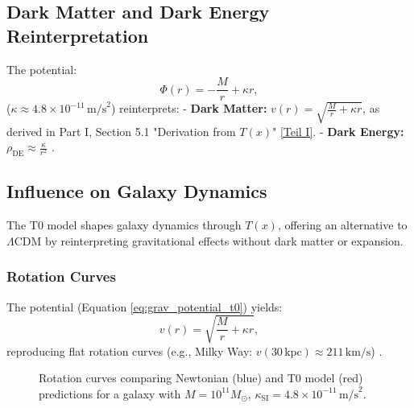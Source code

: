 \documentclass[twocolumn,aps,prl]{revtex4-2}
\newcommand{\Tfield}{T(x)}
\newcommand{\LCDM}{\Lambda\text{CDM}}
\begin{document}
	\subsection{Dark Matter and Dark Energy Reinterpretation}
	\label{subsec:dark_reinterpretation}
	
	The potential:
	\begin{equation}
		\Phi(r) = -\frac{M}{r} + \kappa r,
		\label{eq:grav_potential_t0}
	\end{equation}
	(\(\kappa \approx 4.8 \times 10^{-11} \, \text{m/s}^2\)) reinterprets:
	- \textbf{Dark Matter:} \(v(r) = \sqrt{\frac{M}{r} + \kappa r}\), as derived in Part I, Section 5.1 "Derivation from \(\Tfield\)" \href{https://github.com/jpascher/T0-Time-Mass-Duality/tree/main/2/pdf/English/QMRelTimeMassPart1En.pdf}{[Teil I]}.
	- \textbf{Dark Energy:} \(\rho_{\text{DE}} \approx \frac{\kappa}{r^2}\) \cite{pascher_galaxies_2025}.
	
	\subsection{Influence on Galaxy Dynamics}
	\label{subsec:galaxy_dynamics}
	
	The T0 model shapes galaxy dynamics through \(\Tfield\), offering an alternative to \(\LCDM\) by reinterpreting gravitational effects without dark matter or expansion.
	
	\subsubsection{Rotation Curves}
	The potential (Equation \ref{eq:grav_potential_t0}) yields:
	\begin{equation}
		v(r) = \sqrt{\frac{M}{r} + \kappa r},
		\label{eq:rotation_velocity}
	\end{equation}
	reproducing flat rotation curves (e.g., Milky Way: \(v(30 \, \text{kpc}) \approx 211 \, \text{km/s}\)) \cite{pascher_galaxies_2025}.
	
	\begin{figure}[ht]
		\centering
		\caption{Rotation curves comparing Newtonian (blue) and T0 model (red) predictions for a galaxy with \(M = 10^{11} M_{\odot}\), \(\kappa_{\text{SI}} = 4.8 \times 10^{-11} \, \text{m/s}^2\).}
		\label{fig:rotation_curves}
	\end{figure}
	
\end{document}
